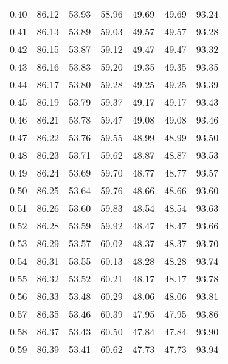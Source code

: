 \begin{tabular}{|c|c|c|c|c|c|c|}
      0.40 &     86.12 &     53.93 &      58.96 &   49.69 &      49.69 &         93.24 \\
      0.41 &     86.13 &     53.89 &      59.03 &   49.57 &      49.57 &         93.28 \\
      0.42 &     86.15 &     53.87 &      59.12 &   49.47 &      49.47 &         93.32 \\
      0.43 &     86.16 &     53.83 &      59.20 &   49.35 &      49.35 &         93.35 \\
      0.44 &     86.17 &     53.80 &      59.28 &   49.25 &      49.25 &         93.39 \\
      0.45 &     86.19 &     53.79 &      59.37 &   49.17 &      49.17 &         93.43 \\
      0.46 &     86.21 &     53.78 &      59.47 &   49.08 &      49.08 &         93.46 \\
      0.47 &     86.22 &     53.76 &      59.55 &   48.99 &      48.99 &         93.50 \\
      0.48 &     86.23 &     53.71 &      59.62 &   48.87 &      48.87 &         93.53 \\
      0.49 &     86.24 &     53.69 &      59.70 &   48.77 &      48.77 &         93.57 \\
      0.50 &     86.25 &     53.64 &      59.76 &   48.66 &      48.66 &         93.60 \\
      0.51 &     86.26 &     53.60 &      59.83 &   48.54 &      48.54 &         93.63 \\
      0.52 &     86.28 &     53.59 &      59.92 &   48.47 &      48.47 &         93.66 \\
      0.53 &     86.29 &     53.57 &      60.02 &   48.37 &      48.37 &         93.70 \\
      0.54 &     86.31 &     53.55 &      60.13 &   48.28 &      48.28 &         93.74 \\
      0.55 &     86.32 &     53.52 &      60.21 &   48.17 &      48.17 &         93.78 \\
      0.56 &     86.33 &     53.48 &      60.29 &   48.06 &      48.06 &         93.81 \\
      0.57 &     86.35 &     53.46 &      60.39 &   47.95 &      47.95 &         93.86 \\
      0.58 &     86.37 &     53.43 &      60.50 &   47.84 &      47.84 &         93.90 \\
      0.59 &     86.39 &     53.41 &      60.62 &   47.73 &      47.73 &         93.94 \\

\end{tabular}
